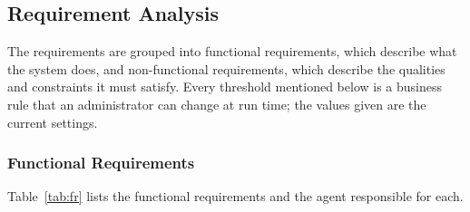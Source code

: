 \subsection{Requirement Analysis}
The requirements are grouped into functional requirements, which describe what the system does, and non-functional requirements, which describe the qualities and constraints it must satisfy. Every threshold mentioned below is a business rule that an administrator can change at run time; the values given are the current settings.

\subsubsection{Functional Requirements}
Table~\ref{tab:fr} lists the functional requirements and the agent responsible for each.

